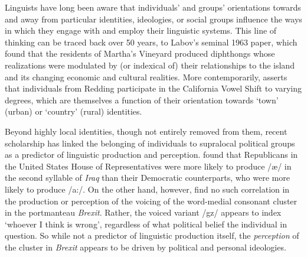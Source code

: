 Linguists have long been aware that individuals' and groups' orientations towards and away from particular identities, ideologies, or social groups influence the ways in which they engage with and employ their linguistic systems. This line of thinking can be traced back over 50 years, to Labov's seminal 1963 paper, which found that the residents of Martha's Vineyard produced diphthongs whose realizations were modulated by (or indexical of) their relationships to the island and its changing economic and cultural realities. More contemporarily, \textcite{podesva2015country} asserts that individuals from Redding participate in the California Vowel Shift to varying degrees, which are themselves a function of their orientation towards `town' (urban) or `country' (rural) identities. \par 
Beyond highly local identities, though not entirely removed from them, recent scholarship has linked the belonging of individuals to supralocal political groups as a predictor of linguistic production and perception. \textcite{hall2010indexing} found that Republicans in the United States House of Representatives were more likely to produce /\ae/ in the second syllable of \textit{Iraq} than their Democratic counterparts, who were more likely to produce /a:/. On the other hand, however, \textcite{hall2020breksit} find no such correlation in the production or perception of the voicing of the word-medial consonant cluster in the portmanteau \textit{Brexit}. Rather, the voiced variant /gz/ appears to index `whoever I think is wrong', regardless of what political belief the individual in question. So while not a predictor of linguistic production itself, the \textit{perception} of the cluster in \textit{Brexit} appears to be driven by political and personal ideologies.\par 
